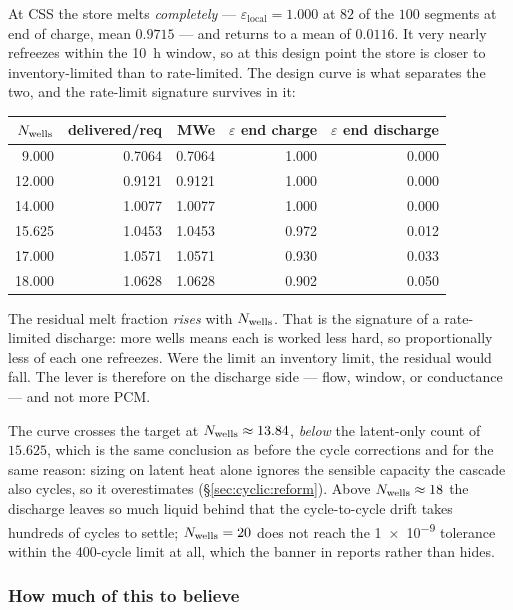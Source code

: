 At CSS the store melts \emph{completely} --- $\varepsilon_{\mathrm{local}}=1.000$
at $82$ of the $100$ segments at end of charge, mean $0.9715$ --- and returns to
a mean of $0.0116$. It very nearly refreezes within the \SI{10}{\hour} window,
so at this design point the store is closer to inventory-limited than to
rate-limited. The design curve is what separates the two, and the rate-limit
signature survives in it:

\begin{center}
\begin{tabular}{@{}r r r r r@{}}
\toprule
$N_{\mathrm{wells}}$ & delivered/req & MWe & $\varepsilon$ end charge & $\varepsilon$ end discharge \\
\midrule
 9.000 & 0.7064 & 0.7064 & 1.000 & 0.000 \\
12.000 & 0.9121 & 0.9121 & 1.000 & 0.000 \\
14.000 & 1.0077 & 1.0077 & 1.000 & 0.000 \\
15.625 & 1.0453 & 1.0453 & 0.972 & 0.012 \\
17.000 & 1.0571 & 1.0571 & 0.930 & 0.033 \\
18.000 & 1.0628 & 1.0628 & 0.902 & 0.050 \\
\bottomrule
\end{tabular}
\end{center}

\noindent
The residual melt fraction \emph{rises} with $N_{\mathrm{wells}}$. That is the signature of
a rate-limited discharge: more wells means each is worked less hard, so
proportionally less of each one refreezes. Were the limit an inventory limit,
the residual would fall. The lever is therefore on the discharge side --- flow,
window, or conductance --- and not more PCM.

The curve crosses the target at $N_{\mathrm{wells}}\approx13.84$, \emph{below} the
latent-only count of $15.625$, which is the same conclusion as before the cycle
corrections and for the same reason: sizing on latent heat alone ignores the
sensible capacity the cascade also cycles, so it overestimates
(\S\ref{sec:cyclic:reform}). Above $N_{\mathrm{wells}}\approx18$ the discharge leaves so
much liquid behind that the cycle-to-cycle drift takes hundreds of cycles to
settle; $N_{\mathrm{wells}}=20$ does not reach the \num{1e-9} tolerance within the
\num{400}-cycle limit at all, which the banner in  reports
rather than hides.

\subsubsection*{How much of this to believe}

